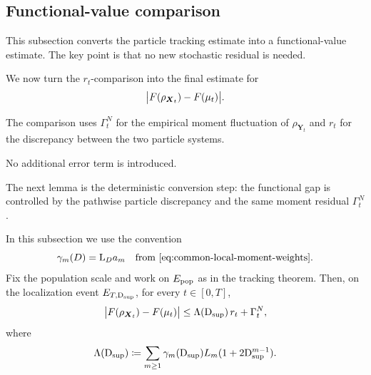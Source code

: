 \subsection{Functional-value comparison}
\label{subsec:functional-gap}

This subsection converts the particle tracking estimate into a functional-value
estimate.  The key point is that no new stochastic residual is needed.

We now turn the $r_t$-comparison into the final estimate for
\[
\bigl|F(\rho_{\boldsymbol{X}_t})-F(\mu_t)\bigr|.
\]

The comparison uses $\Gamma_t^N$ for the empirical moment fluctuation of $\rho_{\mathbf Y_t}$ and $r_t$ for the discrepancy between the two particle systems.

No additional error term is introduced.

The next lemma is the deterministic conversion step: the functional gap is
controlled by the pathwise particle discrepancy and the same moment residual
\(\Gamma_t^N\).
\begin{lemma}
\label{lem:functional-gap-fixed-time-v15}
In this subsection we use the convention
\[
\gamma_m(D)=\mathrm L_Da_m\quad\text{from \cref{eq:common-local-moment-weights}}.
\]
Fix the population scale and work on $E_{\rm pop}$ as in the tracking theorem. Then, on the localization event $E_{T,\mathrm{D}_{\sup}}$, for every $t\in[0,T]$,
\begin{equation}
\label{eq:functional-gap-fixed-time-v15}
\bigl|F(\rho_{\boldsymbol{X}_t})-F(\mu_t)\bigr|
\le
\Lambda(\mathrm{D}_{\sup})\,r_t+\Gamma_t^N,
\end{equation}
where
\[
\Lambda(\mathrm{D}_{\sup})
\coloneq
\sum_{m\ge1}\gamma_m(\mathrm{D}_{\sup})L_m(1+2\mathrm{D}_{\sup}^{m-1}).
\]
\end{lemma}


